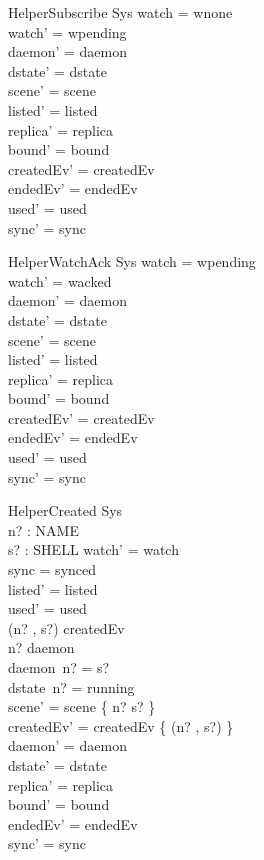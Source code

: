 \documentclass[a4paper,10pt,fleqn]{article}
\begin{document}
\begin{schema}{HelperSubscribe}
  \Delta Sys
\where
  watch = wnone \\
  watch' = wpending \\
  daemon' = daemon \\
  dstate' = dstate \\
  scene' = scene \\
  listed' = listed \\
  replica' = replica \\
  bound' = bound \\
  createdEv' = createdEv \\
  endedEv' = endedEv \\
  used' = used \\
  sync' = sync
\end{schema}

\begin{schema}{HelperWatchAck}
  \Delta Sys
\where
  watch = wpending \\
  watch' = wacked \\
  daemon' = daemon \\
  dstate' = dstate \\
  scene' = scene \\
  listed' = listed \\
  replica' = replica \\
  bound' = bound \\
  createdEv' = createdEv \\
  endedEv' = endedEv \\
  used' = used \\
  sync' = sync
\end{schema}

\begin{schema}{HelperCreated}
  \Delta Sys \\
  n? : NAME \\
  s? : SHELL
\where
  watch' = watch \\
  sync = synced \\
  listed' = listed \\
  used' = used \\
  (n? , s?) \in createdEv \\
  n? \in \dom daemon \\
  daemon~n? = s? \\
  dstate~n? = running \\
  scene' = scene \oplus \{ n? \mapsto s? \} \\
  createdEv' = createdEv \setminus \{ (n? , s?) \} \\
  daemon' = daemon \\
  dstate' = dstate \\
  replica' = replica \\
  bound' = bound \\
  endedEv' = endedEv \\
  sync' = sync
\end{schema}
\end{document}

